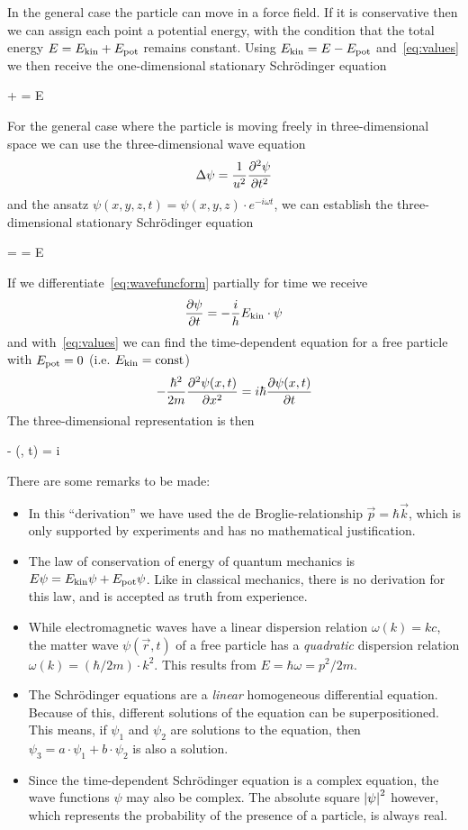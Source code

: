 \documentclass[../../script.tex]{subfiles}
\begin{document}
In the general case the particle can move in a force field. If it is conservative then we can assign each point a potential energy, with the condition that the total energy $E = E_{\text{kin}} + E_{\text{pot}}$ remains constant.
Using $E_{\text{kin}} = E - E_{\text{pot}}$ and~\eqref{eq:values} we then receive the one-dimensional stationary Schrödinger equation
\begin{tcolorbox}
	  + \epot\psi = E\psi
\end{tcolorbox}
For the general case where the particle is moving freely in three-dimensional space we can use the three-dimensional wave equation 
\[
	\Delta\psi = \frac{1}{u^2} \pdv[2]{\psi}{t}	
\]
and the ansatz $\psi(x, y, z, t) = \psi(x, y, z) \cdot e^{-i\omega t}$, we can establish the three-dimensional stationary Schrödinger equation 
\begin{tcolorbox}\label{eq:stationaryschroedinger}
	 \laplacian \psi = \epot \psi = E \psi
\end{tcolorbox}
If we differentiate~\eqref{eq:wavefuncform} partially for time we receive 
\[
	\pdv{\psi}{t} = -\frac{i}{h} E_{\text{kin}} \cdot \psi	
\]
and with~\eqref{eq:values} we can find the time-dependent equation for a free particle with $E_{\text{pot}} = 0$ (i.e. $E_{\text{kin}} = \operatorname{const}$)
\begin{equation}
	-\frac{\hbar^2}{2m} \pdv[2]{\psi(x, t)}{x} = i\hbar \pdv{\psi(x, t)}{t}
\end{equation}
The three-dimensional representation is then 
\begin{tcolorbox}
	- \laplacian \psi(, t) = i\hbar {}
\end{tcolorbox}
There are some remarks to be made:
\begin{itemize}
	\item In this ``derivation'' we have used the de Broglie-relationship $\vec{p} = \hbar \vec{k}$, which is only supported by experiments and has no mathematical justification.
	\item The law of conservation of energy of quantum mechanics is $E\psi = E_{\text{kin}}\psi + E_{\text{pot}}\psi$. Like in classical mechanics, there is no derivation for this law, and is accepted as truth from experience.
	\item While electromagnetic waves have a linear dispersion relation $\omega(k) = kc$, the matter wave $\psi(\vec{r}, t)$ of a free particle has a \textit{quadratic} dispersion relation $\omega(k) = (\hbar/2m) \cdot k^2$. This results from $E = \hbar\omega = p^2/2m$.
	\item The Schrödinger equations are a \textit{linear} homogeneous differential equation. Because of this, different solutions of the equation can be superpositioned. This means, if $\psi_1$ and $\psi_2$ are solutions to the equation, then $\psi_3 = a\cdot\psi_1 + b\cdot\psi_2$ is also a solution.
	\item Since the time-dependent Schrödinger equation is a complex equation, the wave functions $\psi$ may also be complex. The absolute square $\abs{\psi}^2$ however, which represents the probability of the presence of a particle, is always real.
\end{itemize}
\end{document}
